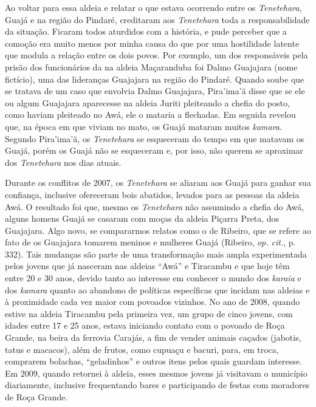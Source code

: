 Ao voltar para essa aldeia e relatar o que estava ocorrendo entre os
\emph{Tenetehara}, Guajá e  na região do Pindaré, creditaram aos
\emph{Tenetehara} toda a responsabilidade da situação. Ficaram todos
aturdidos com a história, e pude perceber que a comoção era muito menos
por minha causa do que por uma hostilidade latente que modula a relação
entre os dois povos. Por exemplo, um dos responsáveis pela prisão dos
funcionários da  na aldeia Maçaranduba foi Dalmo Guajajara (nome
fictício), uma das lideranças Guajajara na região do Pindaré. Quando
soube que se tratava de um caso que envolvia Dalmo Guajajara, Pira'ima'ã
disse que se ele ou algum Guajajara aparecesse na aldeia Juriti
pleiteando a chefia do posto, como haviam pleiteado no  Awá, ele o
mataria a flechadas. Em seguida revelou que, na época em que viviam no
mato, os Guajá mataram muitos \emph{kamara}. Segundo Pira'ima'ã, os
\emph{Tenetehara} se esqueceram do tempo em que matavam os Guajá, porém
os Guajá não se esqueceram e, por isso, não querem se aproximar dos
\emph{Tenetehara} nos dias atuais.

Durante os conflitos de 2007, os \emph{Tenetehara} se aliaram aos Guajá
para ganhar sua confiança, inclusive ofereceram bois abatidos, levados
para as pessoas da aldeia Awá. O resultado foi que, mesmo os
\emph{Tenetehara} não assumindo a chefia do  Awá, alguns homens Guajá
se casaram com moças da aldeia Piçarra Preta, dos Guajajara. Algo novo,
se compararmos relatos como o de Ribeiro, que se refere ao fato de os
Guajajara tomarem meninos e mulheres Guajá (Ribeiro, \emph{op. cit.}, p. 332).
Tais mudanças são parte de uma transformação mais ampla experimentada
pelos jovens que já nasceram nas aldeias ``Awá'' e Tiracambu e que hoje
têm entre 20 e 30 anos, devido tanto ao interesse em conhecer o mundo
dos \emph{karaia} e dos \emph{kamara} quanto ao abandono de políticas
específicas que incidam nas aldeias e à proximidade cada vez maior com
povoados vizinhos. No ano de 2008, quando estive na aldeia Tiracambu
pela primeira vez, um grupo de cinco jovens, com idades entre 17 e 25
anos, estava iniciando contato com o povoado de Roça Grande, na beira da
ferrovia Carajás, a fim de vender animais caçados (jabotis, tatus e
macacos), além de frutos, como cupuaçu e bacuri, para, em troca,
comprarem bolachas, ``geladinhos'' e outros itens pelos quais guardam
interesse. Em 2009, quando retornei à aldeia, esses mesmos jovens já
visitavam o município diariamente, inclusive frequentando bares e
participando de festas com moradores de Roça Grande.

